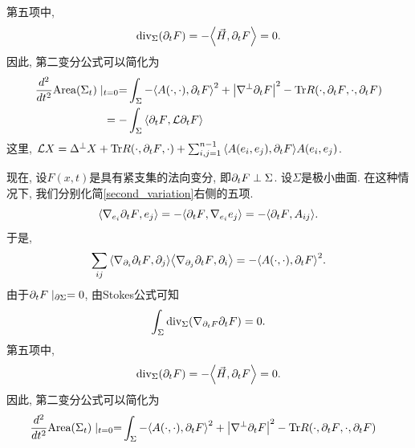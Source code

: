 第五项中,  
\begin{equation}
    {\text{div}}_\Sigma({\partial_t F}) = -{\left < \vec{H}, {\partial_t F} \right >}=0.
\end{equation}
因此, 第二变分公式可以简化为
\begin{equation}
    \begin{split}
        \frac{d^2}{dt^2} \text{Area}(\Sigma_t)\mid_{t=0} =&  \int_\Sigma -{\left < A(\cdot,\cdot), {\partial_t F} \right >}^2+\left | \nabla^\perp {\partial_t F} \right |^2-\text{Tr} R(\cdot,{\partial_t F},\cdot,{\partial_t F})\\
        =-&\int_\Sigma {\left < {\partial_t F}, \mathcal{L}{\partial_t F}\right >}
    \end{split}
\end{equation}
这里, $\mathcal{L} X=\Delta^\perp X+ \text{Tr} R(\cdot,{\partial_t F},\cdot) + \sum_{i,j=1}^{n-1}{\left < A(e_i,e_j), {\partial_t F} \right >}A(e_i,e_j)$.
\fi%

现在, 设$F(x,t)$是具有紧支集的法向变分, 即${\partial_t F} \perp \Sigma$.  设$\Sigma$是极小曲面.  在这种情况下, 我们分别化简\eqref{second_variation}右侧的五项.
\begin{equation}
    {\left < \nabla_{e_i}{\partial_t F}, e_j \right >} = -{\left < {\partial_t F}, \nabla_{e_i}e_j \right >} = -{\left < {\partial_t F}, A_{ij} \right >}.
\end{equation}
于是, 
\begin{equation}
    \sum_{ij}{\left < \nabla_{{\partial_i}}{\partial_t F}, {\partial_j} \right >}{\left < \nabla_{{\partial_j}}{\partial_t F}, {\partial_i} \right >}=-{\left < A(\cdot,\cdot), {\partial_t F} \right >}^2.
\end{equation}
由于${\partial_t F}\mid_{\partial \Sigma}=0$, 由Stokes公式可知
\begin{equation}
    \int_\Sigma {\text{div}}_\Sigma(\nabla_{{\partial_t F}}{\partial_t F})=0.
\end{equation}
第五项中,  
\begin{equation}
    {\text{div}}_\Sigma({\partial_t F}) = -{\left < \vec{H}, {\partial_t F} \right >}=0.
\end{equation}
因此, 第二变分公式可以简化为
\begin{equation}
    \begin{split}
        \frac{d^2}{dt^2} \text{Area}(\Sigma_t)\mid_{t=0} =&  \int_\Sigma -{\left < A(\cdot,\cdot), {\partial_t F} \right >}^2+\left | \nabla^\perp {\partial_t F} \right |^2-\text{Tr} R(\cdot,{\partial_t F},\cdot,{\partial_t F})
    \end{split}
\end{equation}

